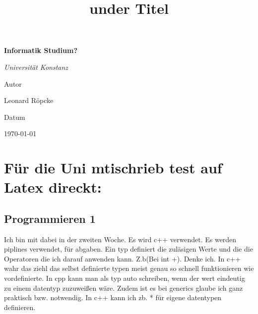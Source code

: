 \documentclass{article}
\title{under Titel}
\newcommand{\AuthorName}{Leonard Röpcke}
\newcommand{\Institute}{}
\newcommand{\header}{Informatik Studium?}
\newcommand{\Subtitle}{Universität Konstanz}
\newcommand{\MyDate}{\today}
\begin{document}
\begin{titlepage}
  \centering
  {\scshape\LARGE \Institute \par}
  \vspace{2.5cm}
  {\huge\bfseries \header \par}
  \vspace{0.8cm}
  {\Large\itshape \Subtitle \par}
  \vfill
  {\Large Autor\par}
  {\Large \AuthorName \par}
  \vspace{1cm}
  {\Large Datum\par}
  {\Large \MyDate \par}
  \vfill
  \vspace{1cm}
  {\small }
\end{titlepage}
\section*{Für die Uni mtischrieb test auf Latex direckt:}
\subsection{Programmieren 1}
Ich bin mit dabei in der zweiten Woche. Es wird c++ verwendet. Es werden piplines verwendet, für abgaben.
Ein typ definiert die zuläsigen Werte und die die Operatoren die ich darauf anwenden kann. Z.b(Bei int +). Denke ich.
In c++ wahr das ziehl das selbst definierte typen meist genau so schnell funktionieren wie vordefinierte.
In cpp kann man als typ auto schreiben, wenn der wert eindeutig zu einem datentyp zuzuweißen wäre. Zudem ist es bei 
generics glaube ich ganz praktisch bzw. notwendig. In c++ kann ich zb. * für eigene datentypen definieren.
\end{document}

